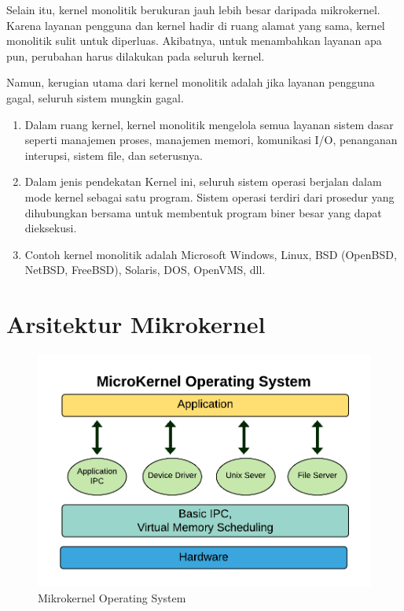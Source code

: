 \documentclass{report}
\begin{document}
	Selain itu, kernel monolitik berukuran jauh lebih besar daripada mikrokernel. Karena layanan pengguna dan kernel hadir di ruang alamat yang sama, kernel monolitik sulit untuk diperluas. Akibatnya, untuk menambahkan layanan apa pun, perubahan harus dilakukan pada seluruh kernel.
	
	Namun, kerugian utama dari kernel monolitik adalah jika layanan pengguna gagal, seluruh sistem mungkin gagal.
	
	\begin{enumerate}
		\item Dalam ruang kernel, kernel monolitik mengelola semua layanan sistem dasar seperti manajemen proses, manajemen memori, komunikasi I/O, penanganan interupsi, sistem file, dan seterusnya.
		
		\item Dalam jenis pendekatan Kernel ini, seluruh sistem operasi berjalan dalam mode kernel sebagai satu program. Sistem operasi terdiri dari prosedur yang dihubungkan bersama untuk membentuk program biner besar yang dapat dieksekusi.
		
		\item Contoh kernel monolitik adalah Microsoft Windows, Linux, BSD (OpenBSD, NetBSD, FreeBSD), Solaris, DOS, OpenVMS, dll.
	\end{enumerate}

	\vskip0.5cm

	\section*{Arsitektur Mikrokernel}

	\begin{figure}
		\centering
		\includegraphics[width=12cm]{Mikrokernel-1.png}
		\caption{Mikrokernel Operating System}
	\end{figure}
	
\end{document}
